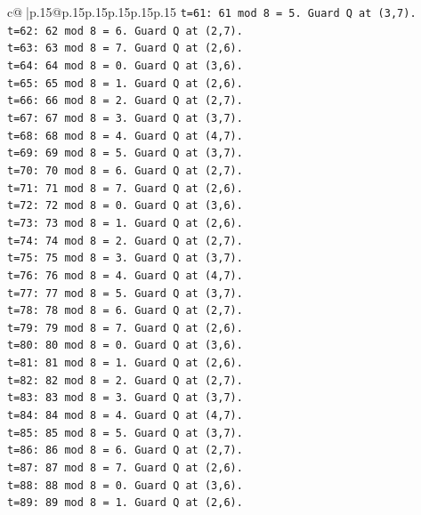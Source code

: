 \documentclass{article}
\begin{document}
{\begin{supertabular}{c@{$\;$}|p{.15\linewidth}@{}p{.15\linewidth}p{.15\linewidth}p{.15\linewidth}p{.15\linewidth}p{.15\linewidth}}
{{{\texttt{t=61: 61 mod 8 = 5. Guard Q at (3,7).} \\
\texttt{t=62: 62 mod 8 = 6. Guard Q at (2,7).} \\
\texttt{t=63: 63 mod 8 = 7. Guard Q at (2,6).} \\
\texttt{t=64: 64 mod 8 = 0. Guard Q at (3,6).} \\
\texttt{t=65: 65 mod 8 = 1. Guard Q at (2,6).} \\
\texttt{t=66: 66 mod 8 = 2. Guard Q at (2,7).} \\
\texttt{t=67: 67 mod 8 = 3. Guard Q at (3,7).} \\
\texttt{t=68: 68 mod 8 = 4. Guard Q at (4,7).} \\
\texttt{t=69: 69 mod 8 = 5. Guard Q at (3,7).} \\
\texttt{t=70: 70 mod 8 = 6. Guard Q at (2,7).} \\
\texttt{t=71: 71 mod 8 = 7. Guard Q at (2,6).} \\
\texttt{t=72: 72 mod 8 = 0. Guard Q at (3,6).} \\
\texttt{t=73: 73 mod 8 = 1. Guard Q at (2,6).} \\
\texttt{t=74: 74 mod 8 = 2. Guard Q at (2,7).} \\
\texttt{t=75: 75 mod 8 = 3. Guard Q at (3,7).} \\
\texttt{t=76: 76 mod 8 = 4. Guard Q at (4,7).} \\
\texttt{t=77: 77 mod 8 = 5. Guard Q at (3,7).} \\
\texttt{t=78: 78 mod 8 = 6. Guard Q at (2,7).} \\
\texttt{t=79: 79 mod 8 = 7. Guard Q at (2,6).} \\
\texttt{t=80: 80 mod 8 = 0. Guard Q at (3,6).} \\
\texttt{t=81: 81 mod 8 = 1. Guard Q at (2,6).} \\
\texttt{t=82: 82 mod 8 = 2. Guard Q at (2,7).} \\
\texttt{t=83: 83 mod 8 = 3. Guard Q at (3,7).} \\
\texttt{t=84: 84 mod 8 = 4. Guard Q at (4,7).} \\
\texttt{t=85: 85 mod 8 = 5. Guard Q at (3,7).} \\
\texttt{t=86: 86 mod 8 = 6. Guard Q at (2,7).} \\
\texttt{t=87: 87 mod 8 = 7. Guard Q at (2,6).} \\
\texttt{t=88: 88 mod 8 = 0. Guard Q at (3,6).} \\
\texttt{t=89: 89 mod 8 = 1. Guard Q at (2,6).} \\
}}}
\end{supertabular}}
\end{document}
